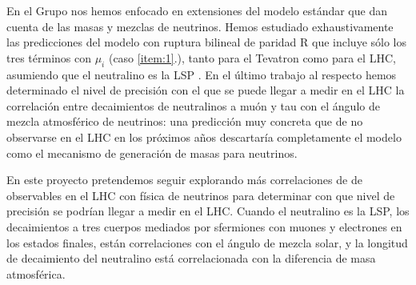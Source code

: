 
En el Grupo nos hemos enfocado en extensiones del modelo estándar que
dan cuenta de las masas y mezclas de neutrinos. Hemos estudiado
exhaustivamente las predicciones del modelo con ruptura bilineal de
paridad R que incluye sólo los tres términos con $\mu_i$ (caso
\ref{item:1}.), tanto para el Tevatron como para el LHC, asumiendo que
el neutralino es la LSP
\cite{Magro:2003zb,deCampos:2005ri,deCampos:2007bn,deCampos:2008ic,deCampos:2008re,DeCampos:2010yu}. En
el último trabajo al respecto hemos determinado el nivel de precisión
con el que se puede llegar a medir en el LHC la correlación entre
decaimientos de neutralinos a muón y tau con el ángulo de mezcla
atmosférico de neutrinos: una predicción muy concreta que de no
observarse en el LHC en los próximos años descartaría completamente el
modelo como el mecanismo de generación de masas para neutrinos.
\begin{proyecto}
  En este proyecto pretendemos seguir explorando más correlaciones de
  de observables en el LHC con física de neutrinos para determinar con
  que nivel de precisión se podrían llegar a medir en el LHC. Cuando
  el neutralino es la LSP, los decaimientos a tres cuerpos mediados
  por sfermiones con muones y electrones en los estados finales, están
  correlaciones con el ángulo de mezcla solar, y la longitud de
  decaimiento del neutralino está correlacionada con la diferencia de
  masa atmosférica.
\end{proyecto}

